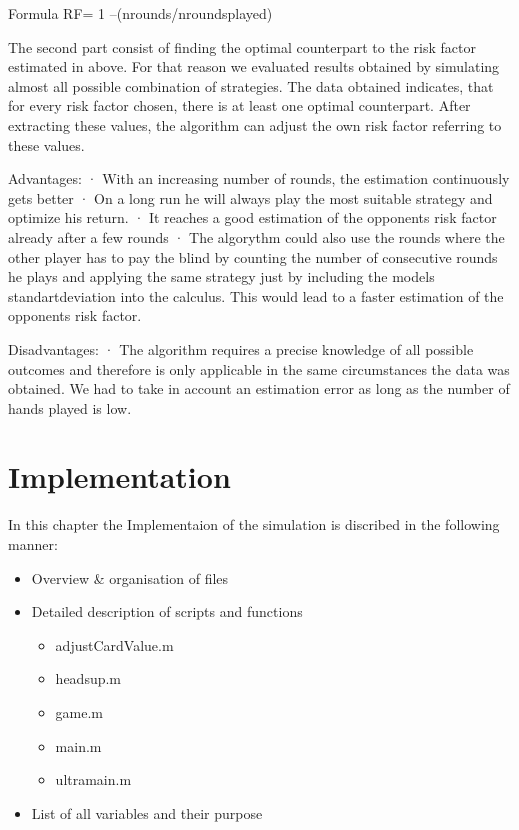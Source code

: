 \documentclass[11pt]{article}
\begin{document}
Formula RF= 1 –(nrounds/nroundsplayed)
 
The second part consist of finding the optimal counterpart to the risk factor estimated in above. For that reason we evaluated results obtained by simulating almost all possible combination of strategies. The data obtained indicates, that for every risk factor chosen, there is at least one optimal counterpart. After extracting these values, the algorithm can adjust the own risk factor referring to these values.
 
Advantages:
·         With an increasing number of rounds, the estimation continuously gets better
·          On a long run he will always play the most suitable strategy and optimize his return.
·         It reaches a good estimation of the opponents risk factor already after a few rounds
·         The algorythm could also use the rounds where the other player has to pay the blind by counting the number of consecutive rounds he plays and applying the same strategy just by including the models standartdeviation into the calculus. This would lead to a faster estimation of the opponents risk factor.
 
Disadvantages:
·         The algorithm requires a precise knowledge of all possible outcomes and therefore is only applicable in the same circumstances the data was obtained.
We had to take in account an estimation error as long as the number of hands played is low.








\section{Implementation}
In this chapter the Implementaion of the simulation is discribed in the following manner:
\begin{itemize}
\item Overview \& organisation of files
\item Detailed description of scripts and functions
    \begin{itemize}
    	\item adjustCardValue.m
        \item headsup.m
        \item game.m
        \item main.m
        \item ultramain.m
    \end{itemize}
\item List of all variables and their purpose
\end{itemize}
\end{document}
